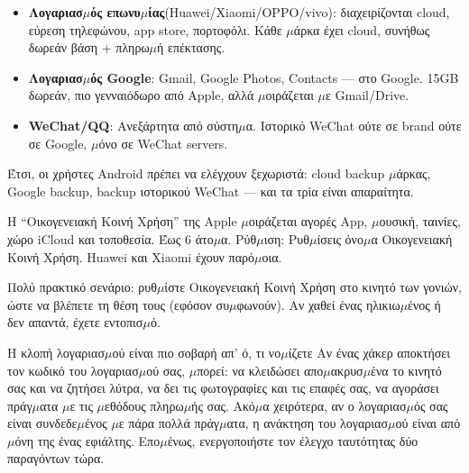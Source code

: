 \begin{itemize}
  \item \textbf{Λογαριασ$\mu$ός επωνυ$\mu$ίας}(Huawei/Xiaomi/OPPO/vivo): διαχειρίζονται cloud, εύρεση τηλεφώνου, app store, πορτοφόλι. Κάθε $\mu$άρκα έχει cloud, συνήθως δωρεάν βάση + πληρω$\mu$ή επέκτασης.
  \item \textbf{Λογαριασ$\mu$ός Google}: Gmail, Google Photos, Contacts — στο Google. 15GB δωρεάν, πιο γενναιόδωρο από Apple, αλλά $\mu$οιράζεται $\mu$ε Gmail/Drive.
  \item \textbf{WeChat/QQ}: Ανεξάρτητα από σύστη$\mu$α. Ιστορικό WeChat ούτε σε brand ούτε σε Google, $\mu$όνο σε WeChat servers.
\end{itemize}

Έτσι, οι χρήστες Android πρέπει να ελέγχουν ξεχωριστά: cloud backup $\mu$άρκας, Google backup, backup ιστορικού WeChat — και τα τρία είναι απαραίτητα.


Η “Οικογενειακή Κοινή Χρήση” της Apple $\mu$οιράζεται αγορές App, $\mu$ουσική, ταινίες, χώρο iCloud και τοποθεσία. Έως 6 άτο$\mu$α. Ρύθ$\mu$ιση: Ρυθ$\mu$ίσεις όνο$\mu$α Οικογενειακή Κοινή Χρήση. Huawei και Xiaomi έχουν παρό$\mu$οια.

Πολύ πρακτικό σενάριο: ρυθ$\mu$ίστε Οικογενειακή Κοινή Χρήση στο κινητό των γονιών, ώστε να βλέπετε τη θέση τους (εφόσον συ$\mu$φωνούν). Αν χαθεί ένας ηλικιω$\mu$ένος ή δεν απαντά, έχετε εντοπισ$\mu$ό.

\begin{tcbwarn}{Η κλοπή λογαριασ$\mu$ού είναι πιο σοβαρή απ' ό, τι νο$\mu$ίζετε}
Αν ένας χάκερ αποκτήσει τον κωδικό του λογαριασ$\mu$ού σας, $\mu$πορεί: να κλειδώσει απο$\mu$ακρυσ$\mu$ένα το κινητό σας και να ζητήσει λύτρα, να δει τις φωτογραφίες και τις επαφές σας, να αγοράσει πράγ$\mu$ατα $\mu$ε τις $\mu$εθόδους πληρω$\mu$ής σας. Ακό$\mu$α χειρότερα, αν ο λογαριασ$\mu$ός σας είναι συνδεδε$\mu$ένος $\mu$ε πάρα πολλά πράγ$\mu$ατα, η ανάκτηση του λογαριασ$\mu$ού είναι από $\mu$όνη της ένας εφιάλτης. Επο$\mu$ένως, ενεργοποιήστε τον έλεγχο ταυτότητας δύο παραγόντων τώρα.

\end{tcbwarn}

